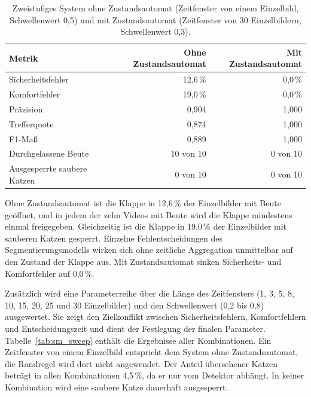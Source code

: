 \begin{table}[H]
    \centering
    \begin{tabular}{lrr}
        \toprule
        Metrik & Ohne Zustandsautomat & Mit Zustandsautomat \\
        \midrule
        Sicherheitsfehler & 12,6\,\% & 0,0\,\% \\
        Komfortfehler & 19,0\,\% & 0,0\,\% \\
        Präzision & 0,904 & 1,000 \\
        Trefferquote & 0,874 & 1,000 \\
        F1-Maß & 0,889 & 1,000 \\
        Durchgelassene Beute & 10 von 10 & 0 von 10 \\
        Ausgesperrte saubere Katzen & 0 von 10 & 0 von 10 \\
        \bottomrule
    \end{tabular}
    \caption{Zweistufiges System ohne Zustandsautomat (Zeitfenster von einem Einzelbild, Schwellenwert 0,5) und mit Zustandsautomat (Zeitfenster von 30 Einzelbildern, Schwellenwert 0,3).}
    \label{tab:sm_ablation}
\end{table}

Ohne Zustandsautomat ist die Klappe in 12,6\,\% der Einzelbilder mit Beute geöffnet, und in jedem der zehn Videos mit Beute wird die Klappe mindestens einmal freigegeben. Gleichzeitig ist die Klappe in 19,0\,\% der Einzelbilder mit sauberen Katzen gesperrt. Einzelne Fehlentscheidungen des Segmentierungsmodells wirken sich ohne zeitliche Aggregation unmittelbar auf den Zustand der Klappe aus. Mit Zustandsautomat sinken Sicherheits- und Komfortfehler auf 0,0\,\%.

Zusätzlich wird eine Parameterreihe über die Länge des Zeitfensters (1, 3, 5, 8, 10, 15, 20, 25 und 30 Einzelbilder) und den Schwellenwert (0,2 bis 0,8) ausgewertet. Sie zeigt den Zielkonflikt zwischen Sicherheitsfehlern, Komfortfehlern und Entscheidungszeit und dient der Festlegung der finalen Parameter. Tabelle~\ref{tab:sm_sweep} enthält die Ergebnisse aller Kombinationen. Ein Zeitfenster von einem Einzelbild entspricht dem System ohne Zustandsautomat, die Randregel wird dort nicht angewendet. Der Anteil übersehener Katzen beträgt in allen Kombinationen 4,5\,\%, da er nur vom Detektor abhängt. In keiner Kombination wird eine saubere Katze dauerhaft ausgesperrt.

